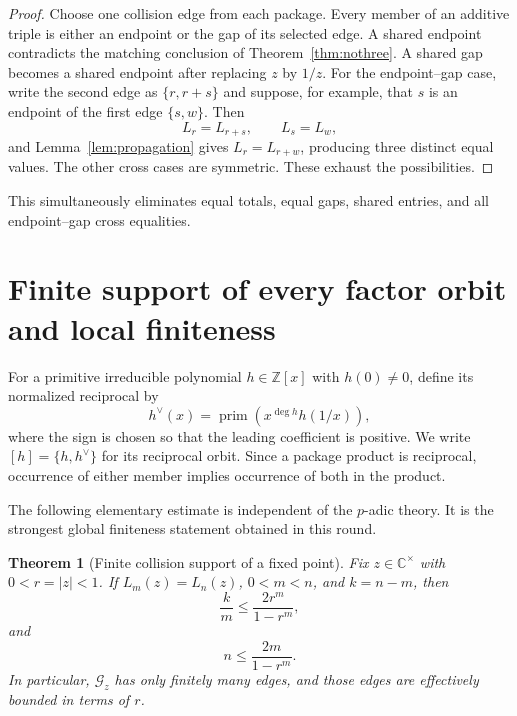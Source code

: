 \documentclass[11pt]{article}
\newtheorem{theorem}{Theorem}[section]
\theoremstyle{definition}
\newcommand{\Z}{\mathbb Z}
\newcommand{\C}{\mathbb C}
\begin{document}
\begin{proof}
Choose one collision edge from each package.  Every member of an additive
triple is either an endpoint or the gap of its selected edge.  A shared
endpoint contradicts the matching conclusion of Theorem~\ref{thm:nothree}.
A shared gap becomes a shared endpoint after replacing \(z\) by \(1/z\).
For the endpoint--gap case, write the second edge as
\(\{r,r+s\}\) and suppose, for example, that \(s\) is an endpoint of
the first edge \(\{s,w\}\).  Then
\[
 L_r=L_{r+s},\qquad L_s=L_w,
\]
and Lemma~\ref{lem:propagation} gives \(L_r=L_{r+w}\), producing three
distinct equal values.  The other cross cases are symmetric.  These exhaust
the possibilities.
\end{proof}

This simultaneously eliminates equal totals, equal gaps, shared entries, and
all endpoint--gap cross equalities.

\section{Finite support of every factor orbit and local finiteness}
\label{sec:finite-support}

For a primitive irreducible polynomial \(h\in\Z[x]\) with \(h(0)\neq0\),
define its normalized reciprocal by
\[
 h^\vee(x)=\operatorname{prim}\!\left(x^{\deg h}h(1/x)\right),
\]
where the sign is chosen so that the leading coefficient is positive.  We
write \([h]=\{h,h^\vee\}\) for its reciprocal orbit.  Since a package
product is reciprocal, occurrence of either member implies occurrence of both
in the product.

The following elementary estimate is independent of the \(p\)-adic theory.
It is the strongest global finiteness statement obtained in this round.

\begin{theorem}[Finite collision support of a fixed point]
\label{thm:pointfinite}
Fix \(z\in\C^\times\) with \(0<r=|z|<1\).  If
\(L_m(z)=L_n(z)\), \(0<m<n\), and \(k=n-m\), then
\begin{equation}
 \frac{k}{m}
 \leq \frac{2r^m}{1-r^m},
 \tag{4.1}
\end{equation}
and
\begin{equation}
 n\leq\frac{2m}{1-r^m}.
 \tag{4.2}
\end{equation}
In particular, \(\mathcal G_z\) has only finitely many edges, and those edges
are effectively bounded in terms of \(r\).
\end{theorem}
\end{document}
